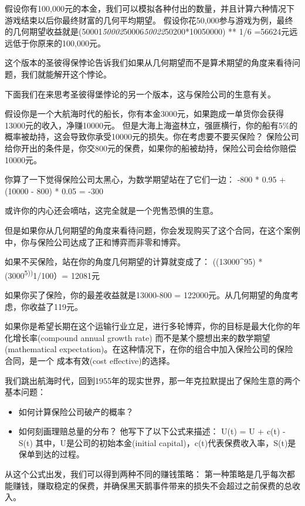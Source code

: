 \documentclass[
  oneside]{book}
\providecommand{\tightlist}{%
  \setlength{\itemsep}{0pt}\setlength{\parskip}{0pt}}
\begin{document}
假设你有100,000元的本金，我们可以模拟各种付出的数量，并且计算六种情况下游戏结束以后你最终财富的几何平均期望。
假设你花50,000参与游戏为例，最终的几何期望收益就是(50001\emph{50002}50006\emph{50022}50200*10050000) ** 1/6 =56624元远远低于你原来的100,000元。

这个版本的圣彼得保悖论告诉我们如果从几何期望而不是算术期望的角度来看待问题，我们就能解开这个悖论。

下面我们在来思考圣彼得堡悖论的另一个版本，这与保险公司的生意有关。

假设你是一个大航海时代的船长，你有本金3000元，如果跑成一单货你会获得13000元的收入，净赚10000元。
但是大海上海盗林立，强匪横行，你的船有5\%的概率被劫持，这会导致你承受10000元的损失。你在考虑要不要买保险？
保险公司给你开出的条件是，你交800元的保费，如果你的船被劫持，保险公司会给你赔偿10000元。

你算了一下觉得保险公司太黑心，为数学期望站在了它们一边：
-800 * 0.95 + (10000 - 800) * 0.05 = -300

或许你的内心还会嘀咕，这完全就是一个兜售恐惧的生意。

但是如果你从几何期望的角度来看待问题，你会发现购买了这个合同，在这个案例中，你与保险公司达成了正和博弈而非零和博弈。

如果不买保险，站在你的角度几何期望的计算就变成了：
((13000\^{}95) * (3000\textsuperscript{5))}1/100）= 12081元

如果你买了保险，你的最差收益就是13000-800 = 122000元。从几何期望的角度考虑，你收益了119元。

如果你是希望长期在这个运输行业立足，进行多轮博弈，你的目标是最大化你的年化增长率(compound annual growth rate)
而不是某个臆想出来的数学期望(mathematical expectation)。在这种情况下，在你的组合中加入保险公司的保险合同，是一个
成本有效(cost effective)的选择。

我们跳出航海时代，回到1955年的现实世界，那一年克拉默提出了保险生意的两个基本问题：

\begin{itemize}
\tightlist
\item
  如何计算保险公司破产的概率？
\item
  如何刻画理赔总量的分布？
  他写下了以下公式来描述：
  U(t) = U + c(t) - S(t)
  其中，U是公司的初始本金(initial capital)，c(t)代表保费收入率，S(t)是保单到达的过程。
\end{itemize}

从这个公式出发，我们可以得到两种不同的赚钱策略：
第一种策略是几乎每次都能赚钱，赚取稳定的保费，并确保黑天鹅事件带来的损失不会超过之前保费的总收入。
\end{document}
